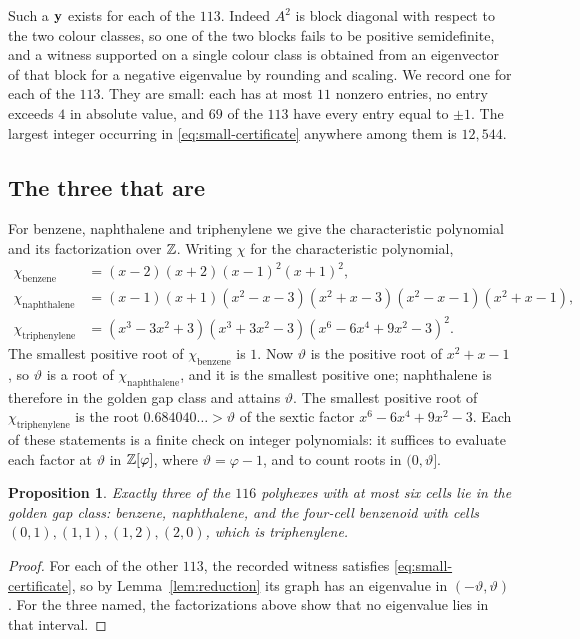 \documentclass[11pt]{article}
\newcommand\vphi{\varphi}
\newcommand\thetaG{\vartheta}
\newtheorem{proposition}[theorem]{Proposition}
\theoremstyle{definition}
\begin{document}
Such a ${\mathbf y}$ exists for each of the $113$.  Indeed $A^{2}$ is block diagonal
with respect to the two colour classes, so one of the two blocks fails to be
positive semidefinite, and a witness supported on a single colour class is
obtained from an eigenvector of that block for a negative eigenvalue by
rounding and scaling.  We record one for each of the $113$.  They are small:
each has at most $11$ nonzero entries, no entry exceeds $4$ in absolute
value, and $69$ of the $113$ have every entry equal to $\pm1$.  The largest
integer occurring in \eqref{eq:small-certificate} anywhere among them is
$12{,}544$.

\subsection{The three that are}

For benzene, naphthalene and triphenylene we give the characteristic
polynomial and its factorization over ${\mathbb Z}$.  Writing $\chi$ for the
characteristic polynomial,
\[
\begin{aligned}
 \chi_{\text{benzene}}&=(x-2)(x+2)(x-1)^{2}(x+1)^{2},\\
 \chi_{\text{naphthalene}}&=(x-1)(x+1)(x^{2}-x-3)(x^{2}+x-3)(x^{2}-x-1)(x^{2}+x-1),\\
 \chi_{\text{triphenylene}}&=(x^{3}-3x^{2}+3)(x^{3}+3x^{2}-3)(x^{6}-6x^{4}+9x^{2}-3)^{2}.
\end{aligned}
\]
The smallest positive root of $\chi_{\text{benzene}}$ is $1$.  Now
$\thetaG$ is the positive root of $x^{2}+x-1$, so $\thetaG$ is a root of
$\chi_{\text{naphthalene}}$, and it is the smallest positive one; naphthalene
is therefore in the golden gap class and attains $\thetaG$.  The smallest
positive root of $\chi_{\text{triphenylene}}$ is the root
$0.684040\ldots>\thetaG$ of the sextic factor $x^{6}-6x^{4}+9x^{2}-3$.  Each
of these statements is a finite check on integer polynomials: it suffices to
evaluate each factor at $\thetaG$ in $\ints[\vphi]$, where $\thetaG=\vphi-1$,
and to count roots in $(0,\thetaG]$.

\begin{proposition}\label{prop:small}
Exactly three of the $116$ polyhexes with at most six cells lie in the
golden gap class: benzene, naphthalene, and the four-cell benzenoid with
cells $(0,1),(1,1),(1,2),(2,0)$, which is triphenylene.
\end{proposition}

\begin{proof}
For each of the other $113$, the recorded witness satisfies
\eqref{eq:small-certificate}, so by Lemma~\ref{lem:reduction} its graph has
an eigenvalue in $(-\thetaG,\thetaG)$.  For the three named, the
factorizations above show that no eigenvalue lies in that interval.
\end{proof}
\end{document}
